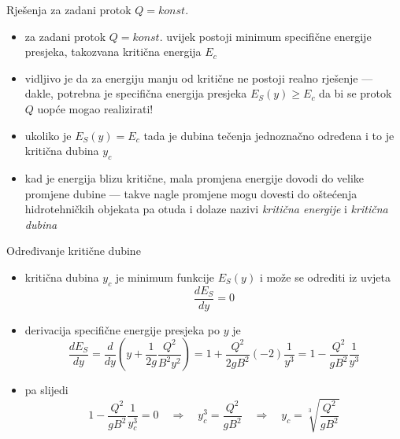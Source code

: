 \documentclass[croatian]{beamer}
\begin{document}
\begin{frame}{Rješenja za zadani protok $Q=konst.$}

\begin{itemize}
\item za zadani protok $Q=konst.$ uvijek postoji minimum specifične energije
presjeka, takozvana \alert{kritična energija}\emph{ $E_{c}$}
\item vidljivo je da za energiju manju od kritične ne postoji realno rješenje
--- dakle, potrebna je specifična energija presjeka $E_{S}(y)\geq E_{c}$
da bi se protok $Q$ uopće mogao realizirati!
\item ukoliko je $E_{S}(y)=E_{c}$ tada je dubina tečenja jednoznačno određena
i to je \alert{kritična dubina}\emph{ $y_{c}$}
\item kad je energija blizu kritične, mala promjena energije dovodi do velike
promjene dubine --- takve nagle promjene mogu dovesti do oštećenja
hidrotehničkih objekata pa otuda i dolaze nazivi \emph{kritična energije}
i \emph{kritična dubina}
\end{itemize}
\end{frame}

\begin{frame}{Određivanje kritične dubine}

\begin{itemize}
\item kritična dubina $y_{c}$ je minimum funkcije $E_{S}(y)$ i može se
odrediti iz uvjeta
\[
\frac{dE_{S}}{dy}=0
\]
\item derivacija specifične energije presjeka po $y$ je
\[
\frac{dE_{S}}{dy}=\frac{d}{dy}\left(y+\frac{1}{2g}\frac{Q^{2}}{B^{2}y^{2}}\right)=1+\frac{Q^{2}}{2gB^{2}}(-2)\frac{1}{y^{3}}=1-\frac{Q^{2}}{gB^{2}}\frac{1}{y^{3}}
\]
\item pa slijedi
\[
1-\frac{Q^{2}}{gB^{2}}\frac{1}{y_{c}^{3}}=0\quad\Rightarrow\quad y_{c}^{3}=\frac{Q^{2}}{gB^{2}}\quad\Rightarrow\quad y_{c}=\sqrt[3]{\frac{Q^{2}}{gB^{2}}}
\]
\end{itemize}
\end{frame}
\end{document}
